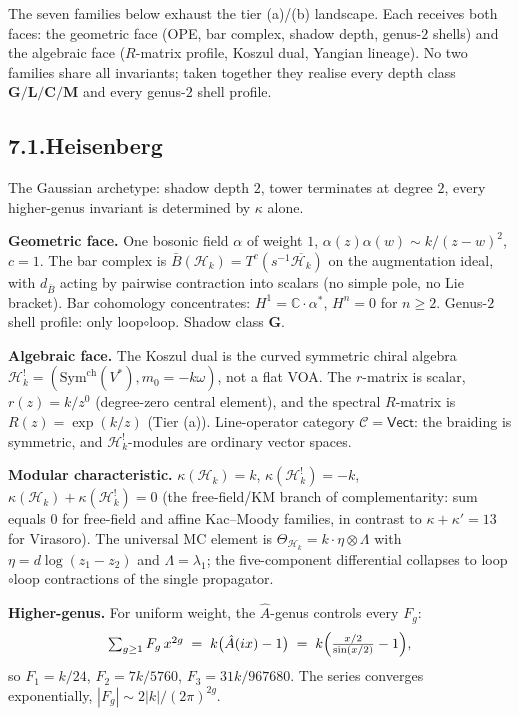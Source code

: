 \documentclass[11pt,reqno]{amsart}
\theoremstyle{definition}
\theoremstyle{remark}
\providecommand{\cC}{\mathcal{C}}
\providecommand{\cH}{\mathcal{H}}
\providecommand{\barB}{\bar{B}}
\providecommand{\Sym}{\mathrm{Sym}}
\providecommand{\bC}{\mathbb{C}}
\providecommand{\ch}{\mathrm{ch}}
\numberwithin{equation}{section}
\begin{document}
The seven families below exhaust the tier (a)/(b) landscape.
Each receives both faces: the geometric face (OPE, bar complex,
shadow depth, genus-$2$ shells) and the algebraic face
($R$-matrix profile, Koszul dual, Yangian lineage). No two
families share all invariants; taken together they realise
every depth class $\mathbf G / \mathbf L / \mathbf C / \mathbf M$
and every genus-$2$ shell profile.

\subsection*{7.1.\quad Heisenberg}

The Gaussian archetype: shadow depth $2$, tower terminates at
degree $2$, every higher-genus invariant is determined by $\kappa$
alone.

\medskip\noindent\textbf{Geometric face.} One bosonic field
$\alpha$ of weight $1$, $\alpha(z)\alpha(w) \sim k/(z-w)^2$,
$c = 1$. The bar complex is
$\barB(\cH_k) = T^c(s^{-1}\overline{\cH_k})$ on the augmentation
ideal, with $d_{\barB}$ acting by pairwise contraction
into scalars (no simple pole, no Lie bracket). Bar cohomology
concentrates: $H^1 = \bC\cdot\alpha^*$, $H^n = 0$ for $n \ge 2$.
Genus-$2$ shell profile: only loop$\circ$loop. Shadow class
$\mathbf G$.

\medskip\noindent\textbf{Algebraic face.} The Koszul dual is
the curved symmetric chiral algebra
$\cH_k^! = (\Sym^{\ch}(V^*), m_0 = -k\omega)$, not a flat VOA.
The $r$-matrix is scalar, $r(z) = k/z^0$ (degree-zero central
element), and the spectral $R$-matrix is $R(z) = \exp(k/z)$
(Tier (a)). Line-operator category $\cC = \mathsf{Vect}$:
the braiding is symmetric, and $\cH_k^!$-modules are ordinary
vector spaces.

\medskip\noindent\textbf{Modular characteristic.}
$\kappa(\cH_k) = k$, $\kappa(\cH_k^!) = -k$,
$\kappa(\cH_k) + \kappa(\cH_k^!) = 0$ (the free-field/KM
branch of complementarity: sum equals $0$ for free-field and
affine Kac--Moody families, in contrast to $\kappa + \kappa' =
13$ for Virasoro). The universal MC element is
$\Theta_{\cH_k} = k \cdot \eta \otimes \Lambda$ with
$\eta = d\log(z_1 - z_2)$ and $\Lambda = \lambda_1$; the
five-component differential collapses to loop$\circ$loop
contractions of the single propagator.

\medskip\noindent\textbf{Higher-genus.} For uniform weight,
the $\hat A$-genus controls every $F_g$:
\begin{equation}\label{eq:ahat-universality-preface-b}
\textstyle\sum_{g\ge 1} F_g\, x^{2g}
\;=\;
k\bigl(\hat A(ix)-1\bigr)
\;=\;
k\Bigl(\tfrac{x/2}{\sin(x/2)}-1\Bigr),
\end{equation}
so $F_1 = k/24$, $F_2 = 7k/5760$, $F_3 = 31k/967680$. The series
converges exponentially, $|F_g| \sim 2|k|/(2\pi)^{2g}$.
\end{document}
